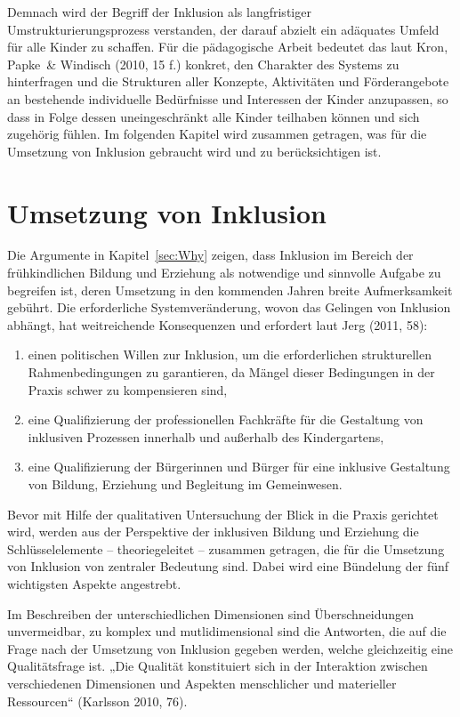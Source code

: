 Demnach wird der Begriff der Inklusion als langfristiger Umstrukturierungsprozess verstanden, der darauf abzielt ein adäquates  Umfeld für alle Kinder zu schaffen. Für die pädagogische Arbeit bedeutet das laut Kron, Papke~\& Windisch (2010, 15 f.) konkret, den Charakter des Systems zu hinterfragen und die Strukturen aller Konzepte, Aktivitäten und Förderangebote an bestehende individuelle Bedürfnisse und Interessen der Kinder anzupassen, so dass in Folge dessen uneingeschränkt alle Kinder teilhaben können und sich zugehörig fühlen.
Im folgenden Kapitel wird zusammen getragen, was für die Umsetzung von Inklusion gebraucht wird und zu berücksichtigen ist.

\section{Umsetzung von Inklusion}
\label{sec:Wie} 

Die Argumente in Kapitel~\ref{sec:Why} zeigen, dass Inklusion im Bereich der frühkindlichen Bildung und Erziehung als notwendige und sinnvolle Aufgabe zu begreifen ist, deren Umsetzung in den kommenden Jahren breite Aufmerksamkeit gebührt. Die erforderliche Systemveränderung, wovon das Gelingen von Inklusion abhängt, hat weitreichende Konsequenzen und erfordert laut Jerg (2011, 58):

\begin{enumerate}
\item einen politischen Willen zur Inklusion, um die erforderlichen strukturellen Rahmenbedingungen zu garantieren, da Mängel dieser Bedingungen in der Praxis schwer zu kompensieren sind,
\item eine Qualifizierung der professionellen Fachkräfte für die Gestaltung von inklusiven Prozessen innerhalb und außerhalb des Kindergartens,
\item eine Qualifizierung der Bürgerinnen und Bürger für eine inklusive Gestaltung von Bildung, Erziehung und Begleitung im Gemeinwesen.
\end{enumerate}

Bevor mit Hilfe der qualitativen Untersuchung der Blick in die Praxis gerichtet wird, werden aus der Perspektive der inklusiven Bildung und Erziehung die Schlüsselelemente -- theoriegeleitet -- zusammen getragen, die für die Umsetzung von Inklusion von zentraler Bedeutung sind.
Dabei wird eine Bündelung der fünf wichtigsten Aspekte angestrebt.

Im Beschreiben der unterschiedlichen Dimensionen sind Überschneidungen unvermeidbar, zu komplex und mutlidimensional sind die Antworten, die auf die Frage nach der Umsetzung von Inklusion gegeben werden, welche  gleichzeitig eine Qualitätsfrage ist.  
„Die Qualität konstituiert sich in der Interaktion zwischen verschiedenen Dimensionen und Aspekten menschlicher und materieller Ressourcen“ (Karlsson 2010, 76).

